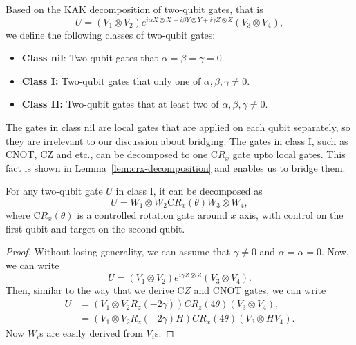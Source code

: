 \begin{definition}
  Based on the KAK decomposition of two-qubit gates, that is
  \begin{equation}
    U = (V_1 \otimes V_2) e^{i \alpha X \otimes X + i \beta Y \otimes Y + i \gamma Z \otimes Z} (V_3 \otimes V_4),
  \end{equation}
  we define the following classes of two-qubit gates:
  \begin{itemize}
    \item \textbf{Class nil}: Two-qubit gates that $\alpha = \beta = \gamma = 0$.
    \item \textbf{Class I:} Two-qubit gates that only one of $\alpha, \beta, \gamma \neq 0$.
    \item \textbf{Class II:} Two-qubit gates that at least two of $\alpha, \beta, \gamma \neq 0$.
  \end{itemize}
\end{definition}

The gates in class nil are local gates that are applied on each qubit separately, so they are irrelevant to our discussion about bridging. The gates in class I, such as CNOT, CZ and etc., can be decomposed to one $\mathrm{C}R_x$ gate upto local gates. This fact is shown in Lemma~\ref{lem:crx-decomposition} and enables us to bridge them.

\begin{lemma}\label{lem:crx-decomposition}
  For any two-qubit gate $U$ in class I, it can be decomposed as
  \begin{equation}
    U = W_1 \otimes W_2 \mathrm{C}R_x(\theta) W_3 \otimes W_4,
  \end{equation}
  where $\mathrm{C}R_x(\theta)$ is a controlled rotation gate around $x$ axis, with control on the first qubit and target on the second qubit.
\end{lemma}
\begin{proof}
  Without losing generality, we can assume that $\gamma \neq 0$ and $\alpha = \alpha = 0$. Now, we can write
  \begin{equation}
    U = (V_1 \otimes V_2) e^{i \gamma Z \otimes Z} (V_3 \otimes V_4).
  \end{equation}
  Then, similar to the way that we derive $\mathrm{C}Z$ and $\mathrm{CNOT}$ gates, we can write
  \begin{equation}
    \begin{aligned}
    U &= (V_1 \otimes V_2 R_z(-2\gamma)) CR_z(4\theta) (V_3 \otimes V_4), \\
    &= (V_1 \otimes V_2 R_z(-2\gamma) H) CR_x(4\theta) (V_3 \otimes H V_4).
    \end{aligned}
  \end{equation}
  Now $W_i$s are easily derived from $V_i$s.
\end{proof}

